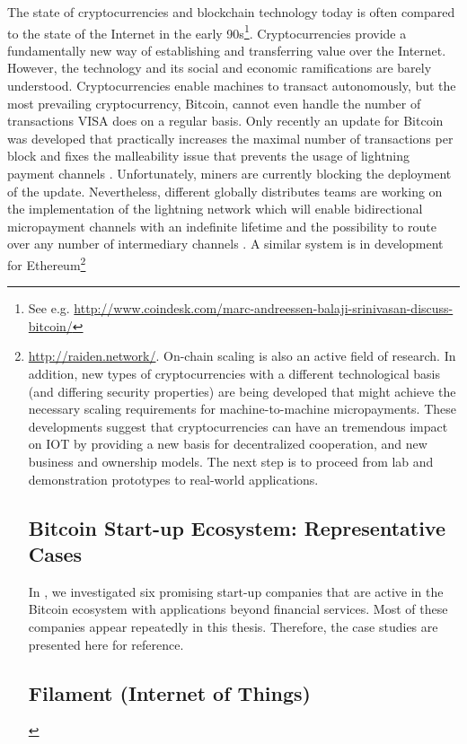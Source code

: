 The state of cryptocurrencies and blockchain technology today is often compared to the state of the Internet in the early 90s\footnote{See e.g. \url{http://www.coindesk.com/marc-andreessen-balaji-srinivasan-discuss-bitcoin/}}. Cryptocurrencies provide a fundamentally new way of establishing and transferring value over the Internet. However, the technology and its social and economic ramifications are barely understood.
Cryptocurrencies enable machines to transact autonomously, but the most prevailing cryptocurrency, Bitcoin, cannot even handle the number of transactions VISA does on a regular basis. Only recently an update for Bitcoin was developed that practically increases the maximal number of transactions per block and fixes the malleability issue that prevents the usage of lightning payment channels \parencite{bip141}. Unfortunately, miners are currently blocking the deployment of the update. Nevertheless, different globally distributes teams are working on the implementation of the lightning network which will enable bidirectional micropayment channels with an indefinite lifetime and the possibility to route over any number of intermediary channels \parencite{BitFuryFlare2016}. A similar system is in development for Ethereum\footnote{\url{http://raiden.network/}. On-chain scaling is also an active field of research. In addition, new types of cryptocurrencies with a different technological basis (and differing security properties) are being developed that might achieve the necessary scaling requirements for machine-to-machine micropayments. These developments suggest that cryptocurrencies can have an tremendous impact on \ac{IOT} by providing a new basis for decentralized cooperation, and new business and ownership models. 
The next step is to proceed from lab and demonstration prototypes to real-world applications. 


\newpage
\appendix
\chapter{Bitcoin Start-up Ecosystem: Representative Cases}
\label{appendix:cases}

In \parencite{Worner2016ecis}, we investigated six promising start-up companies that are active in the Bitcoin ecosystem with applications beyond financial services. Most of these companies appear repeatedly in this thesis. Therefore, the case studies are presented here for reference.

\section{Filament (Internet of Things)}
\label{sec:ecofilament}

}

